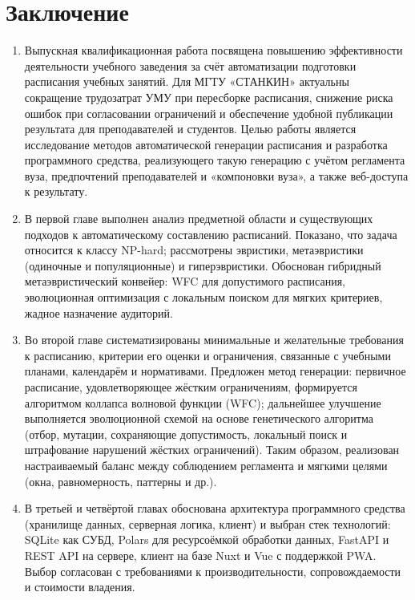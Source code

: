 {}

\section*{Заключение}

\begin{enumerate} [nosep, left = 0pt]
	\item Выпускная квалификационная работа посвящена повышению эффективности деятельности учебного заведения за счёт автоматизации подготовки расписания учебных занятий. Для МГТУ «СТАНКИН» актуальны сокращение трудозатрат УМУ при пересборке расписания, снижение риска ошибок при согласовании ограничений и обеспечение удобной публикации результата для преподавателей и студентов. Целью работы является исследование методов автоматической генерации расписания и разработка программного средства, реализующего такую генерацию с учётом регламента вуза, предпочтений преподавателей и «компоновки вуза», а также веб-доступа к результату.

	\item В первой главе выполнен анализ предметной области и существующих подходов к автоматическому составлению расписаний. Показано, что задача относится к классу NP-hard; рассмотрены эвристики, метаэвристики (одиночные и популяционные) и гиперэвристики. Обоснован гибридный метаэвристический конвейер: WFC для допустимого расписания, эволюционная оптимизация с локальным поиском для мягких критериев, жадное назначение аудиторий.

	\item Во второй главе систематизированы минимальные и желательные требования к расписанию, критерии его оценки и ограничения, связанные с учебными планами, календарём и нормативами. Предложен метод генерации: первичное расписание, удовлетворяющее жёстким ограничениям, формируется алгоритмом коллапса волновой функции (WFC); дальнейшее улучшение выполняется эволюционной схемой на основе генетического алгоритма (отбор, мутации, сохраняющие допустимость, локальный поиск и штрафование нарушений жёстких ограничений). Таким образом, реализован настраиваемый баланс между соблюдением регламента и мягкими целями (окна, равномерность, паттерны и др.).

	\item В третьей и четвёртой главах обоснована архитектура программного средства (хранилище данных, серверная логика, клиент) и выбран стек технологий: SQLite как СУБД, Polars для ресурсоёмкой обработки данных, FastAPI и REST API на сервере, клиент на базе Nuxt и Vue с поддержкой PWA. Выбор согласован с требованиями к производительности, сопровождаемости и стоимости владения.


\end{enumerate}

